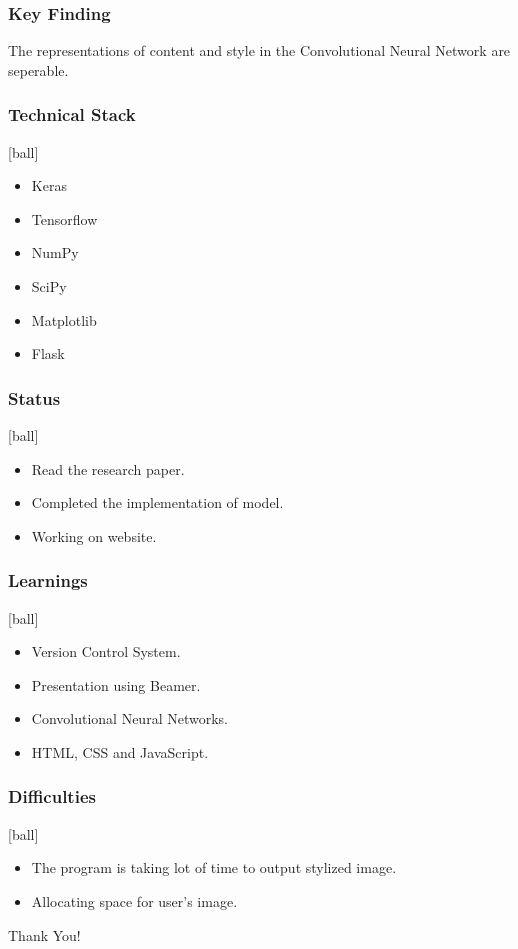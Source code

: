 \documentclass[14pt]{beamer}
\begin{document}
\begin{frame}
		\frametitle{Key Finding}
		The representations of content and style in the Convolutional Neural Network are seperable.
\end{frame}

\begin{frame}
		\frametitle{Technical Stack}
		\begin{itemize}
		\item Keras 
        \item Tensorflow
		\item NumPy
		\item SciPy
        \item Matplotlib
		\item Flask  
		\end{itemize}
\end{frame}

\begin{frame}
		\frametitle{Status}
		\begin{itemize}
		\item Read the research paper.
		\item Completed the implementation of model.
        \item Working on website.
		\end{itemize}
\end{frame}

\begin{frame}
		\frametitle{Learnings}
        \begin{itemize}
		\item Version Control System.
		\item Presentation using Beamer.
		\item Convolutional Neural Networks.
        \item HTML, CSS and JavaScript.
		\end{itemize}
\end{frame}

\begin{frame}
		\frametitle{Difficulties}
        \begin{itemize}

				\item The program is taking lot of time to output stylized image.
                \item Allocating space for user's image.
		\end{itemize}
\end{frame}

\begin{frame}
    \begin{center}  
       \Huge Thank You!
    \end{center}
\end{frame}
\end{document}
